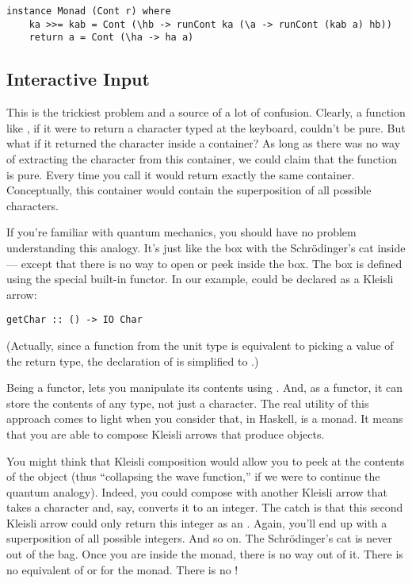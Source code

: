 \begin{Verbatim}
instance Monad (Cont r) where
    ka >>= kab = Cont (\hb -> runCont ka (\a -> runCont (kab a) hb))
    return a = Cont (\ha -> ha a)
\end{Verbatim}

\subsection{Interactive Input}\label{interactive-input}

This is the trickiest problem and a source of a lot of confusion.
Clearly, a function like , if it were to return a
character typed at the keyboard, couldn't be pure. But what if it
returned the character inside a container? As long as there was no way
of extracting the character from this container, we could claim that the
function is pure. Every time you call  it would return
exactly the same container. Conceptually, this container would contain
the superposition of all possible characters.

If you're familiar with quantum mechanics, you should have no problem
understanding this analogy. It's just like the box with the
Schrödinger's cat inside --- except that there is no way to open or peek
inside the box. The box is defined using the special built-in
 functor. In our example,  could be declared
as a Kleisli arrow:

\begin{Verbatim}[commandchars=\\\{\}]
getChar :: () -> IO Char
\end{Verbatim}
(Actually, since a function from the unit type is equivalent to picking
a value of the return type, the declaration of  is
simplified to .)

Being a functor,  lets you manipulate its contents using
. And, as a functor, it can store the contents of any type,
not just a character. The real utility of this approach comes to light
when you consider that, in Haskell,  is a monad. It means
that you are able to compose Kleisli arrows that produce 
objects.

You might think that Kleisli composition would allow you to peek at the
contents of the  object (thus ``collapsing the wave
function,'' if we were to continue the quantum analogy). Indeed, you
could compose  with another Kleisli arrow that takes a
character and, say, converts it to an integer. The catch is that this
second Kleisli arrow could only return this integer as an
. Again, you'll end up with a superposition of all
possible integers. And so on. The Schrödinger's cat is never out of the
bag. Once you are inside the  monad, there is no way out of
it. There is no equivalent of  or 
for the  monad. There is no !

